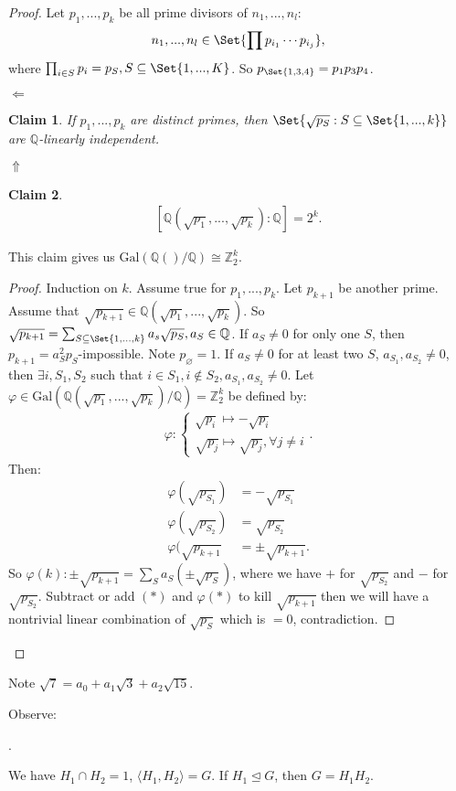 \documentclass[9pt,reqno,twoside]{amsbook}
\let\emptyset\varnothing
\theoremstyle{plain}
\newtheorem*{Claim}{Claim}
\numberwithin{section}{chapter}
\numberwithin{equation}{chapter}
\theoremstyle{definition}
\theoremstyle{remark}
\theoremstyle{plain}
\newcommand{\norm}{\trianglelefteq}
\newcommand{\sub}{\subseteq}
\newcommand{\z}{\mathbb{Z}}
\newcommand{\Q}{\mathbb{Q}}
\newcommand{\bee}{\begin{equation}\begin{aligned}}
\newcommand{\eee}{\end{aligned}\end{equation}}
\newcommand{\lpar}{\left(}
\newcommand{\rpar}{\right)}
\newcommand{\gal}{\mathrm{Gal}}
\newcommand{\qwe}{\sqrt}
\renewcommand{\phi}{\varphi}
\begin{document}
\begin{proof}
Let $p_1,...,p_k$ be all prime divisors of $n_1,...,n_l$:
\bee
n_1,...,n_l \in \Set{\prod p_{i_1}\cdots p_{i_j}},
\eee
where $\prod_{i \in S}p_i = p_S, S \sub \Set{1,...,K}$. So $p_{\Set{1,3,4}} = p_1p_3p_4$. 

$\Leftarrow$\begin{Claim}
If $p_1,...,p_k$ are distinct primes, then $\Set{\qwe{p_S}:S \sub \Set{1,...,k}}$ are $\Q$-linearly independent. 
\end{Claim}
$\Uparrow$

\begin{Claim}
\bee
\left[\Q\lpar \qwe{p_1},...,\qwe{p_k} \rpar :\Q \right] = 2^k.
\eee
\end{Claim}

This claim gives us $\gal(\Q()/\Q) \cong \z_2^k$. 

\begin{proof}
Induction on $k$. Assume true for $p_1,...,p_k$. Let $p_{k + 1}$ be another prime. Assume that $\qwe{p_{k + 1}} \in \Q(\qwe{p_1},...,\qwe{p_k})$. So $\qwe{p_{k + 1}}= \sum_{S \sub\Set{1,...,k}}a_s \qwe{p_S}, a_S \in \Q$. If $a_S \neq 0$ for only one $S$, then $p_{k + 1} = a_S^2p_S$-impossible. Note $p_{\emptyset} = 1$. 
If $a_S \neq 0$ for at least two $S$, $a_{S_1},a_{S_2} \neq 0$, then $\exists i,S_1,S_2$ such that $i \in S_1,i \notin S_2,a_{S_1},a_{S_2}\neq 0$. Let $\phi \in \gal(\Q(\qwe{p_1},...,\qwe{p_k})/\Q) = \z_2^k$ be defined by:
\bee
\phi:\begin{cases}
\qwe{p_i}\mapsto -\qwe{p_i}\\
\qwe{p_j}\mapsto \qwe{p_j}, \forall j \neq i
\end{cases}.
\eee
Then:
\bee
\phi(\qwe{p_{S_1}}) &= -\qwe{p_{S_1}}\\
\phi(\qwe{p_{S_2}}) &= \qwe{p_{S_2}}\\
\phi(\qwe{p_{k + 1}} &= \pm \qwe{p_{k + 1}}.
\eee
So $\phi(k): \pm \qwe{p_{k + 1}} = \sum_{S}a_S(\pm\qwe{p_S})$, where we have $+$ for $\qwe{p_{S_2}}$ and $-$ for $\qwe{p_{S_2}}$. Subtract or add $(*)$ and $\phi(*)$ to kill $\qwe{p_{k + 1}}$ then we will have a nontrivial linear combination of $\qwe{p_S}$ which is $=0$, contradiction. 
\end{proof}
\end{proof}

Note $\qwe{7} = a_0 + a_1 \qwe{3} + a_2 \qwe{15}$. 

Observe:
\begin{center}
.
\end{center}
We have $H_1\cap H_2 = 1$, $\langle H_1,H_2 \rangle  = G$. If $H_1 \norm G$, then $G = H_1H_2$. 
\end{document}
